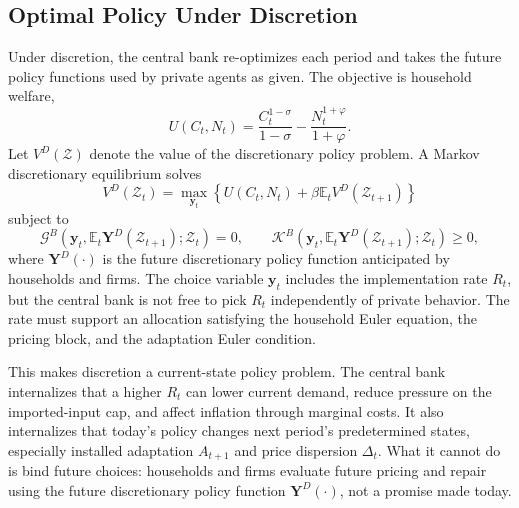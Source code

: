 ﻿\documentclass[12pt]{article}
\theoremstyle{remark}
\newcommand{\E}{\mathbb E}
\begin{document}
\subsection{Optimal Policy Under Discretion}

Under discretion, the central bank re-optimizes each period and takes the future policy functions
used by private agents as given. The objective is household welfare,
\begin{equation}
    U(C_t,N_t)
    =
    \frac{C_t^{1-\sigma}}{1-\sigma}
    -
    \frac{N_t^{1+\varphi}}{1+\varphi}.
    \label{eq:period_welfare}
\end{equation}
Let $V^D(\mathcal Z)$ denote the value of the discretionary policy problem. A Markov discretionary
equilibrium solves
\begin{equation}
    V^D(\mathcal Z_t)
    =
    \max_{\mathbf y_t}
    \left\{
        U(C_t,N_t)
        +
        \beta
        \E_t V^D(\mathcal Z_{t+1})
    \right\}
    \label{eq:discretion_bellman}
\end{equation}
subject to
\begin{equation}
    \mathcal G^B
    \left(
        \mathbf y_t,
        \E_t\mathbf Y^D(\mathcal Z_{t+1});
        \mathcal Z_t
    \right)
    =
    0,
    \qquad
    \mathcal K^B
    \left(
        \mathbf y_t,
        \E_t\mathbf Y^D(\mathcal Z_{t+1});
        \mathcal Z_t
    \right)
    \ge 0,
    \label{eq:discretion_constraints}
\end{equation}
where $\mathbf Y^D(\cdot)$ is the future discretionary policy function anticipated by households
and firms. The choice variable $\mathbf y_t$ includes the implementation rate $R_t$, but the
central bank is not free to pick $R_t$ independently of private behavior. The rate must support an
allocation satisfying the household Euler equation, the pricing block, and the adaptation Euler
condition.

This makes discretion a current-state policy problem. The central bank internalizes that a higher
$R_t$ can lower current demand, reduce pressure on the imported-input cap, and affect inflation
through marginal costs. It also internalizes that today's policy changes next period's
predetermined states, especially installed adaptation $A_{t+1}$ and price dispersion $\Delta_t$.
What it cannot do is bind future choices: households and firms evaluate future pricing and repair
using the future discretionary policy function $\mathbf Y^D(\cdot)$, not a promise made today.
\end{document}
